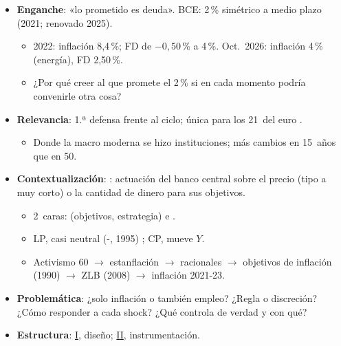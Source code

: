 \documentclass{article}
\begin{document}
\cabecerarepaso
\begin{columnas}

\begin{itemize}
\item \textbf{Enganche}: «lo prometido es deuda». BCE: 2\,\% simétrico a medio plazo (2021; renovado 2025).
  \begin{itemize}
  \item 2022: inflación 8,4\,\%; FD de $-0{,}50$\,\% a 4\,\%. Oct.\ 2026: inflación 4\,\% (energía), FD 2,50\,\%.
  \item ¿Por qué creer al que promete el 2\,\% si en cada momento podría convenirle otra cosa?
  \end{itemize}
\item \textbf{Relevancia}: 1.ª defensa frente al ciclo; única para los 21~del euro .
  \begin{itemize}
  \item Donde la macro moderna se hizo instituciones; más cambios en 15~años que en 50.
  \end{itemize}
\item \textbf{Contextualización}: : actuación del banco central sobre el precio (tipo a muy corto) o la cantidad de dinero para sus objetivos.
  \begin{itemize}
  \item 2~caras:  (objetivos, estrategia) e .
  \item LP, casi neutral (-, 1995) ; CP, mueve $Y$.
  \item Activismo 60 $\to$ estanflación  $\to$ racionales  $\to$ objetivos de inflación (1990)  $\to$ ZLB (2008) $\to$ inflación 2021-23.
  \end{itemize}
\item \textbf{Problemática}: ¿solo inflación o también empleo? ¿Regla o discreción? ¿Cómo responder a cada shock? ¿Qué controla de verdad y con qué?
\item \textbf{Estructura}: \hyperref[rep:I]{I}, diseño; \hyperref[rep:II]{II}, instrumentación.
\end{itemize}


\end{columnas}
\end{document}

